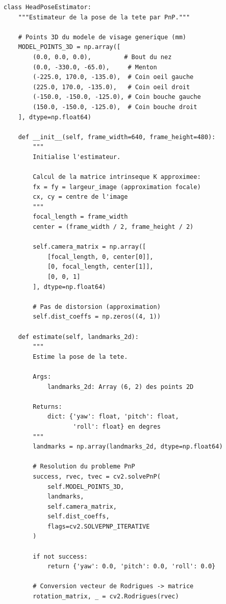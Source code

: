 \documentclass[12pt,a4paper,twoside]{report}
\begin{document}
\begin{lstlisting}[style=pythonstyle, caption={Module d'estimation de la pose de la tête.}, label={lst:head_pose}]
class HeadPoseEstimator:
    """Estimateur de la pose de la tete par PnP."""
    
    # Points 3D du modele de visage generique (mm)
    MODEL_POINTS_3D = np.array([
        (0.0, 0.0, 0.0),         # Bout du nez
        (0.0, -330.0, -65.0),     # Menton
        (-225.0, 170.0, -135.0),  # Coin oeil gauche
        (225.0, 170.0, -135.0),   # Coin oeil droit
        (-150.0, -150.0, -125.0), # Coin bouche gauche
        (150.0, -150.0, -125.0),  # Coin bouche droit
    ], dtype=np.float64)
    
    def __init__(self, frame_width=640, frame_height=480):
        """
        Initialise l'estimateur.
        
        Calcul de la matrice intrinseque K approximee:
        fx = fy = largeur_image (approximation focale)
        cx, cy = centre de l'image
        """
        focal_length = frame_width
        center = (frame_width / 2, frame_height / 2)
        
        self.camera_matrix = np.array([
            [focal_length, 0, center[0]],
            [0, focal_length, center[1]],
            [0, 0, 1]
        ], dtype=np.float64)
        
        # Pas de distorsion (approximation)
        self.dist_coeffs = np.zeros((4, 1))
    
    def estimate(self, landmarks_2d):
        """
        Estime la pose de la tete.
        
        Args:
            landmarks_2d: Array (6, 2) des points 2D
            
        Returns:
            dict: {'yaw': float, 'pitch': float, 
                   'roll': float} en degres
        """
        landmarks = np.array(landmarks_2d, dtype=np.float64)
        
        # Resolution du probleme PnP
        success, rvec, tvec = cv2.solvePnP(
            self.MODEL_POINTS_3D,
            landmarks,
            self.camera_matrix,
            self.dist_coeffs,
            flags=cv2.SOLVEPNP_ITERATIVE
        )
        
        if not success:
            return {'yaw': 0.0, 'pitch': 0.0, 'roll': 0.0}
        
        # Conversion vecteur de Rodrigues -> matrice
        rotation_matrix, _ = cv2.Rodrigues(rvec)
        

\end{lstlisting}
\end{document}
